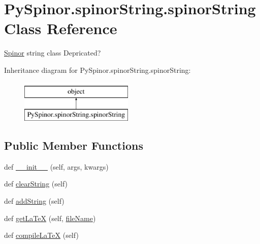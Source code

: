 \hypertarget{class_py_spinor_1_1spinor_string_1_1spinor_string}{}\section{Py\+Spinor.\+spinor\+String.\+spinor\+String Class Reference}
\label{class_py_spinor_1_1spinor_string_1_1spinor_string}


\hyperlink{namespace_py_spinor_1_1_spinor}{Spinor} string class Depricated?  


Inheritance diagram for Py\+Spinor.\+spinor\+String.\+spinor\+String\+:\begin{figure}[H]
\begin{center}
\leavevmode
\includegraphics[height=2.000000cm]{class_py_spinor_1_1spinor_string_1_1spinor_string}
\end{center}
\end{figure}
\subsection*{Public Member Functions}
\begin{DoxyCompactItemize}
\item 
def \hyperlink{class_py_spinor_1_1spinor_string_1_1spinor_string_a5e4372ca15f52da36bfa4ac673d857f4}{\+\_\+\+\_\+init\+\_\+\+\_\+} (self, args, kwargs)
\item 
def \hyperlink{class_py_spinor_1_1spinor_string_1_1spinor_string_acaf7fd9a4f3cb88968f4dccfad0939d8}{clear\+String} (self)
\item 
def \hyperlink{class_py_spinor_1_1spinor_string_1_1spinor_string_a2758ca6f8d4970e6dffbc7a882f8e999}{add\+String} (self)
\item 
def \hyperlink{class_py_spinor_1_1spinor_string_1_1spinor_string_abb012d0d474023b69d3fcbc75da92507}{get\+La\+Te\+X} (self, \hyperlink{class_py_spinor_1_1spinor_string_1_1spinor_string_aa965cbe6144646c9ec83c663a29f1eef}{file\+Name})
\item 
def \hyperlink{class_py_spinor_1_1spinor_string_1_1spinor_string_a45825ae590114faf0f86cffd1d06af8b}{compile\+La\+Te\+X} (self)
\end{DoxyCompactItemize}
